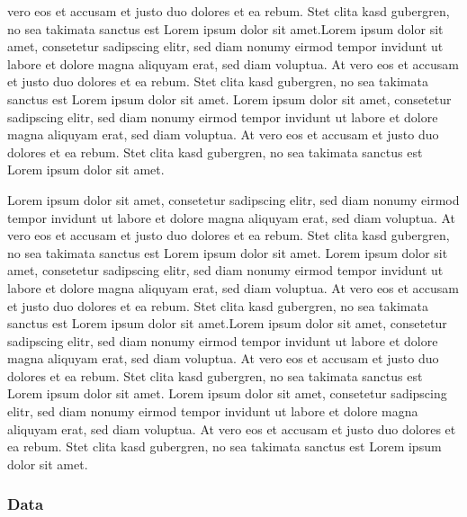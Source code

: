 \documentclass[
  twocolumn]{article}
\newenvironment{Shaded}{\begin{snugshade}}{\end{snugshade}}
\newcommand{\CommentTok}[1]{\textcolor[rgb]{0.56,0.35,0.01}{\textit{#1}}}
\newcommand{\KeywordTok}[1]{\textcolor[rgb]{0.13,0.29,0.53}{\textbf{#1}}}
\newcommand{\NormalTok}[1]{#1}
\newcommand{\OperatorTok}[1]{\textcolor[rgb]{0.81,0.36,0.00}{\textbf{#1}}}
\newcommand{\StringTok}[1]{\textcolor[rgb]{0.31,0.60,0.02}{#1}}
\begin{document}
vero eos et accusam et justo duo dolores et ea rebum. Stet clita kasd
gubergren, no sea takimata sanctus est Lorem ipsum dolor sit amet.Lorem
ipsum dolor sit amet, consetetur sadipscing elitr, sed diam nonumy
eirmod tempor invidunt ut labore et dolore magna aliquyam erat, sed diam
voluptua. At vero eos et accusam et justo duo dolores et ea rebum. Stet
clita kasd gubergren, no sea takimata sanctus est Lorem ipsum dolor sit
amet. Lorem ipsum dolor sit amet, consetetur sadipscing elitr, sed diam
nonumy eirmod tempor invidunt ut labore et dolore magna aliquyam erat,
sed diam voluptua. At vero eos et accusam et justo duo dolores et ea
rebum. Stet clita kasd gubergren, no sea takimata sanctus est Lorem
ipsum dolor sit amet.

Lorem ipsum dolor sit amet, consetetur sadipscing elitr, sed diam nonumy
eirmod tempor invidunt ut labore et dolore magna aliquyam erat, sed diam
voluptua. At vero eos et accusam et justo duo dolores et ea rebum. Stet
clita kasd gubergren, no sea takimata sanctus est Lorem ipsum dolor sit
amet. Lorem ipsum dolor sit amet, consetetur sadipscing elitr, sed diam
nonumy eirmod tempor invidunt ut labore et dolore magna aliquyam erat,
sed diam voluptua. At vero eos et accusam et justo duo dolores et ea
rebum. Stet clita kasd gubergren, no sea takimata sanctus est Lorem
ipsum dolor sit amet.Lorem ipsum dolor sit amet, consetetur sadipscing
elitr, sed diam nonumy eirmod tempor invidunt ut labore et dolore magna
aliquyam erat, sed diam voluptua. At vero eos et accusam et justo duo
dolores et ea rebum. Stet clita kasd gubergren, no sea takimata sanctus
est Lorem ipsum dolor sit amet. Lorem ipsum dolor sit amet, consetetur
sadipscing elitr, sed diam nonumy eirmod tempor invidunt ut labore et
dolore magna aliquyam erat, sed diam voluptua. At vero eos et accusam et
justo duo dolores et ea rebum. Stet clita kasd gubergren, no sea
takimata sanctus est Lorem ipsum dolor sit amet.

\onecolumn

\hypertarget{data}{%
\subsubsection{Data}\label{data}}

\begin{Shaded}
\end{Shaded}
\end{document}
